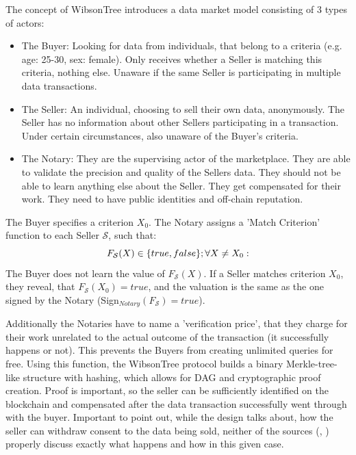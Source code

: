 \documentclass[a4paper,11pt]{report} %
\theoremstyle{change}
\theoremstyle{theoremstyle}
\begin{document}
The concept of WibsonTree \cite{futoransky2020wibsontree} introduces a data market model consisting of 3 types of actors:
\begin{itemize}
    \item The Buyer: Looking for data from individuals, that belong to a criteria (e.g. age: 25-30, sex: female). Only receives whether a Seller is matching this criteria, nothing else. Unaware if the same Seller is participating in multiple data transactions.
    \item The Seller: An individual, choosing to sell their own data, anonymously. The Seller has no information about other Sellers participating in a transaction. Under certain circumstances, also unaware of the Buyer's criteria.
    \item The Notary: They are the supervising actor of the marketplace. They are able to validate the precision and quality of the Sellers data. They should not be able to learn anything else about the Seller. They get compensated for their work. They need to have public identities and off-chain reputation. \cite{travizano2020wibson}
\end{itemize}
The Buyer specifies a criterion $X_0$. The Notary assigns a 'Match Criterion' function to each Seller $\mathcal{S}$, such that:
\begin{equation*}
    F_{\mathcal{S}}(X) \in \{true, false\};\\
    \forall X \neq X_0:
\end{equation*}
The Buyer does not learn the value of $F_{\mathcal{S}}(X)$. If a Seller matches criterion $X_0$, they reveal, that $F_{\mathcal{S}}(X_0) = true$, and the valuation is the same as the one signed by the Notary (Sign$_{Notary} (F_\mathcal{S}) = true$).

Additionally the Notaries have to name a 'verification price', that they charge for their work unrelated to the actual outcome of the transaction (it successfully happens or not). This prevents the Buyers from creating unlimited queries for free.
Using this function, the WibsonTree protocol builds a binary Merkle-tree-like structure with hashing, which allows for DAG and cryptographic proof creation. Proof is important, so the seller can be sufficiently identified on the blockchain and compensated after the data transaction successfully went through with the buyer.
Important to point out, while the design talks about, how the seller can withdraw consent to the data being sold, neither of the sources (\cite{futoransky2020wibsontree}, \cite{travizano2020wibson}) properly discuss exactly what happens and how in this given case.
\end{document}
